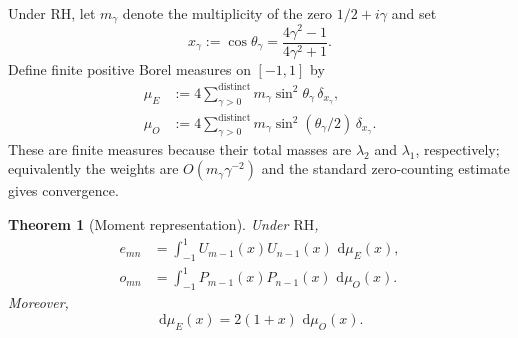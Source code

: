 \documentclass[preprint,12pt]{elsarticle}
\numberwithin{equation}{section}
\theoremstyle{plain}
\newtheorem{theorem}{Theorem}[section]
\theoremstyle{definition}
\theoremstyle{remark}
\newcommand{\RH}{\mathrm{RH}}
\newcommand{\dd}{\,\mathrm d}
\begin{document}
Under $\RH$, let $m_\gamma$ denote the multiplicity of the zero $1/2+i\gamma$ and set
\begin{equation}
x_\gamma:=\cos\theta_\gamma
=\frac{4\gamma^2-1}{4\gamma^2+1}.
\label{eq:x_gamma}
\end{equation}
Define finite positive Borel measures on $[-1,1]$ by
\begin{align}
\mu_E
&:=4\sum_{\gamma>0}^{\mathrm{distinct}}m_\gamma\sin^2\theta_\gamma\,\delta_{x_\gamma},
\label{eq:mu_E}\\
\mu_O
&:=4\sum_{\gamma>0}^{\mathrm{distinct}}m_\gamma\sin^2(\theta_\gamma/2)\,\delta_{x_\gamma}.
\label{eq:mu_O}
\end{align}
These are finite measures because their total masses are $\lambda_2$ and $\lambda_1$, respectively; equivalently the weights are $O(m_\gamma\gamma^{-2})$ and the standard zero-counting estimate gives convergence.

\begin{theorem}[Moment representation]
\label{thm:moment_representation}
Under $\RH$,
\begin{align}
e_{mn}
&=\int_{-1}^{1}U_{m-1}(x)U_{n-1}(x)\,\dd\mu_E(x),
\label{eq:E_moment_representation}\\
o_{mn}
&=\int_{-1}^{1}P_{m-1}(x)P_{n-1}(x)\,\dd\mu_O(x).
\label{eq:O_moment_representation}
\end{align}
Moreover,
\begin{equation}
\dd\mu_E(x)=2(1+x)\,\dd\mu_O(x).
\label{eq:christoffel_measure_relation}
\end{equation}
\end{theorem}
\end{document}
